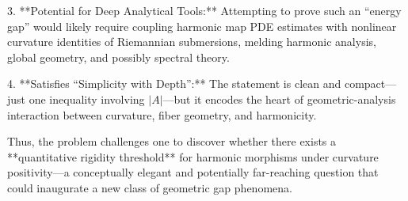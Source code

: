 3. **Potential for Deep Analytical Tools:** Attempting to prove such an “energy gap” would likely require coupling harmonic map PDE estimates with nonlinear curvature identities of Riemannian submersions, melding harmonic analysis, global geometry, and possibly spectral theory.  

4. **Satisfies “Simplicity with Depth”:** The statement is clean and compact—just one inequality involving \(|A|\)—but it encodes the heart of geometric-analysis interaction between curvature, fiber geometry, and harmonicity.  

Thus, the problem challenges one to discover whether there exists a **quantitative rigidity threshold** for harmonic morphisms under curvature positivity—a conceptually elegant and potentially far-reaching question that could inaugurate a new class of geometric gap phenomena.